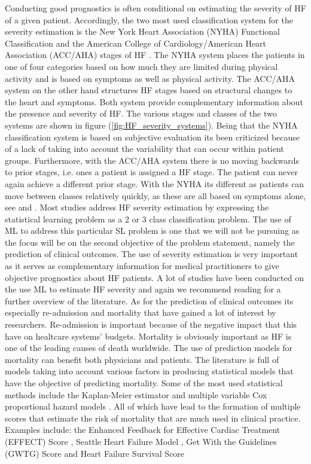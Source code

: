 \documentclass[../thesis.tex]{subfiles}
\begin{document}
\indent Conducting good prognostics is often conditional on estimating the severity of HF of a given patient. Accordingly, the two most used classification system for the severity estimation is the New York Heart Association (NYHA) Functional Classification \citep{new1994nomenclature} and the American College of Cardiology/American Heart Association (ACC/AHA) stages of HF \citep{hunt2001acc}. The NYHA system places the patients in one of four categories based on how much they are limited during physical activity and is based on symptoms as well as physical activity. The ACC/AHA system on the other hand structures HF stages based on structural changes to the heart and symptoms. Both system provide complementary information about the presence and severity of HF. The various stages and classes of the two systems are shown in figure (\ref{fig:HF_severity_systems}). Being that the NYHA classification system is based on subjective evaluation its been criticized because of a lack of taking into account the variability that can occur within patient groups. Furthermore, with the ACC/AHA system there is no moving backwards to prior stages, i.e. ones a patient is assigned a HF stage. The patient can never again achieve a different prior stage. With the NYHA its different as patients can move between classes relatively quickly, as these are all based on symptoms alone, see \cite{fleg2000assessment} and \cite{yancy2013}. Most studies address HF severity estimation by expressing the statistical learning problem as a 2 or 3 class classification problem. The use of ML to address this particular SL problem is one that we will not be pursuing as the focus will be on the second objective of the problem statement, namely the prediction of clinical outcomes. The use of severity estimation is very important as it serves as complementary information for medical practitioners to give objective prognostics about HF patients. A lot of studies have been conducted on the use ML to estimate HF severity and again we recommend reading \cite{tripoliti2017heart} for a further overview of the literature. As for the prediction of clinical outcomes its especially re-admission and mortality that have gained a lot of interest by researchers. Re-admission is important because of the negative impact that this have on healtcare systems' budgets. Mortality is obviously important as HF is one of the leading causes of death worldwide. The use of prediction models for mortality can benefit both physicians and patients. The literature is full of models taking into account various factors in producing statistical models that have the objective of predicting mortality. Some of the most used statistical methods include the Kaplan-Meier estimator \citep{kaplan1958nonparametric} and multiple variable Cox proportional hazard models \citep{cox1972regression}. All of which have lead to the formation of multiple scores that estimate the risk of mortality that are much used in clinical practice. Examples include: the Enhanced Feedback for Effective Cardiac Treatment (EFFECT) Score \citep{lee2003predicting}, Seattle Heart Failure Model \citep{levy2006seattle}, Get With the Guidelines (GWTG) Score \citep{peterson2010validated} and Heart Failure Survival Score 
\end{document}
